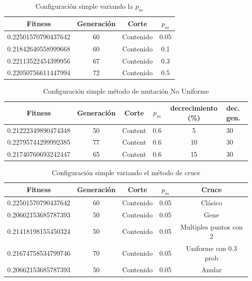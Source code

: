 \documentclass{sig-alternate}
\begin{document}
\begin{table}[htp]
	\begin{center}
	\begin{tabular}{|c|c|c|c|}
		\hline
	     Fitness & Generación & Corte & $p_{m}$ \\
		\hline
		0.22501570790437642 & 60 & Contenido & 0.05 \\
		0.21842640558999668 & 60 & Contenido & 0.1 \\
		0.22113522454399956 & 67 & Contenido & 0.3 \\ 
		0.22050756611447994 & 72 & Contenido & 0.5 \\
		\hline
	\end{tabular}
	\caption{Configuración simple variando la $p_m$}
	\label{table:simple_mutation_prob}
	\end{center}
\end{table}

\begin{table}[htp]
	\begin{center}
	\begin{tabular}{|c|c|c|c|c|p{1cm}|}
		\hline
	     Fitness & Generación & Corte & $p_{m}$ & decrecimiento (\%) & dec. gen. \\
		\hline
		0.21222349890474348 & 50 & Content & 0.6 & 5 & 30 \\
		0.22795744299992385 & 77 & Content & 0.6 & 10  & 30 \\
		0.21740760693242447 & 65 & Content & 0.6 & 15 & 30 \\
		\hline
	\end{tabular}
	\caption{Configuración simple método de mutación No Uniforme}
	\label{table:simple_mutation_no_uniform}
	\end{center}
\end{table}

\begin{table}[htp]
	\begin{center}
	\begin{tabular}{|c|c|c|c|c|}
		\hline
	     Fitness & Generación & Corte & $p_{m}$ & Cruce \\
		\hline
		0.22501570790437642 & 60 & Contenido & 0.05 & Clásico \\
		0.20662153685787393 & 50 & Contenido & 0.05 & Gene \\
		0.21418198155450324 & 50 & Contenido & 0.05 & Multiples puntos con 2 \\
		0.21674758534799746 & 70 & Contenido & 0.05 & Uniforme con 0.3 prob \\
		0.20662153685787393 & 50 & Contenido & 0.05 & Anular \\
		\hline
	\end{tabular}
	\caption{Configuración simple variando el método de cruce}
	\label{table:crossover}
	\end{center}
\end{table}
\end{document}
